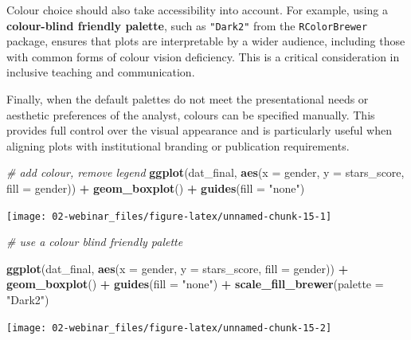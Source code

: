 \documentclass[
  oneside]{book}
\newenvironment{Shaded}{\begin{snugshade}}{\end{snugshade}}
\newcommand{\AttributeTok}[1]{\textcolor[rgb]{0.13,0.29,0.53}{#1}}
\newcommand{\CommentTok}[1]{\textcolor[rgb]{0.56,0.35,0.01}{\textit{#1}}}
\newcommand{\FunctionTok}[1]{\textcolor[rgb]{0.13,0.29,0.53}{\textbf{#1}}}
\newcommand{\NormalTok}[1]{#1}
\newcommand{\SpecialCharTok}[1]{\textcolor[rgb]{0.81,0.36,0.00}{\textbf{#1}}}
\newcommand{\StringTok}[1]{\textcolor[rgb]{0.31,0.60,0.02}{#1}}
\begin{document}
Colour choice should also take accessibility into account. For example, using a \textbf{colour-blind friendly palette}, such as \texttt{"Dark2"} from the \texttt{RColorBrewer} package, ensures that plots are interpretable by a wider audience, including those with common forms of colour vision deficiency. This is a critical consideration in inclusive teaching and communication.

Finally, when the default palettes do not meet the presentational needs or aesthetic preferences of the analyst, colours can be specified manually. This provides full control over the visual appearance and is particularly useful when aligning plots with institutional branding or publication requirements.

\begin{Shaded}
\begin{Highlighting}[]
\CommentTok{\# add colour, remove legend}
\FunctionTok{ggplot}\NormalTok{(dat\_final, }\FunctionTok{aes}\NormalTok{(}\AttributeTok{x =}\NormalTok{ gender, }\AttributeTok{y =}\NormalTok{ stars\_score, }\AttributeTok{fill =}\NormalTok{ gender)) }\SpecialCharTok{+}
  \FunctionTok{geom\_boxplot}\NormalTok{() }\SpecialCharTok{+}
  \FunctionTok{guides}\NormalTok{(}\AttributeTok{fill =} \StringTok{"none"}\NormalTok{)}
\end{Highlighting}
\end{Shaded}

\begin{center}\texttt{[image: 02-webinar\_files/figure-latex/unnamed-chunk-15-1]} \end{center}

\begin{Shaded}
\begin{Highlighting}[]
\CommentTok{\# use a colour blind friendly palette}

\FunctionTok{ggplot}\NormalTok{(dat\_final, }\FunctionTok{aes}\NormalTok{(}\AttributeTok{x =}\NormalTok{ gender, }\AttributeTok{y =}\NormalTok{ stars\_score, }\AttributeTok{fill =}\NormalTok{ gender)) }\SpecialCharTok{+}
  \FunctionTok{geom\_boxplot}\NormalTok{() }\SpecialCharTok{+}
  \FunctionTok{guides}\NormalTok{(}\AttributeTok{fill =} \StringTok{"none"}\NormalTok{) }\SpecialCharTok{+}
  \FunctionTok{scale\_fill\_brewer}\NormalTok{(}\AttributeTok{palette =} \StringTok{"Dark2"}\NormalTok{)}
\end{Highlighting}
\end{Shaded}

\begin{center}\texttt{[image: 02-webinar\_files/figure-latex/unnamed-chunk-15-2]} \end{center}
\end{document}
